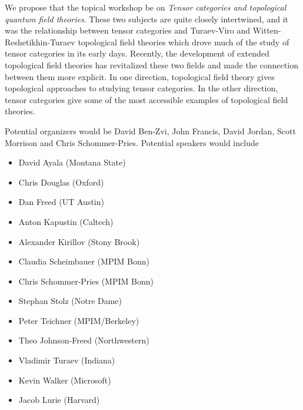 \documentclass[11pt]{article}
\begin{document}
We propose that the topical workshop be on \emph{Tensor categories and topological quantum field theories}. These two subjects are quite closely intertwined, and it was the relationship between tensor categories and Turaev-Viro and Witten-Reshetikhin-Turaev topological field theories which drove much of the study of tensor categories in its early days.  Recently, the development of extended topological field theories has revitalized these two fields and made the connection between them more explicit. In one direction, topological field theory gives topological approaches to studying tensor categories. In the other direction, tensor categories give some of the most accessible examples of topological field theories.

Potential organizers would be David Ben-Zvi, John Francis, David Jordan, Scott Morrison and Chris Schommer-Pries. %
Potential speakers would include 
\begin{multicols}{2}
\begin{itemize}
  \setlength{\itemsep}{1pt}
  \setlength{\parskip}{0pt}
  \setlength{\parsep}{0pt}
\item David Ayala	(Montana State)
\item Chris Douglas	(Oxford)
\item Dan Freed	(UT Austin)
\item Anton Kapustin	(Caltech)
\item Alexander Kirillov	(Stony Brook)
\item Claudia Scheimbauer	(MPIM Bonn)
\item Chris Schommer-Pries	(MPIM Bonn)
\item Stephan Stolz	(Notre Dame)
\item Peter Teichner	(MPIM/Berkeley)
\item Theo Johnson-Freed	(Northwestern)
\item Vladimir Turaev	(Indiana)
\item Kevin Walker (Microsoft)
\item Jacob Lurie (Harvard)
\end{itemize}
\end{multicols}
\end{document}
